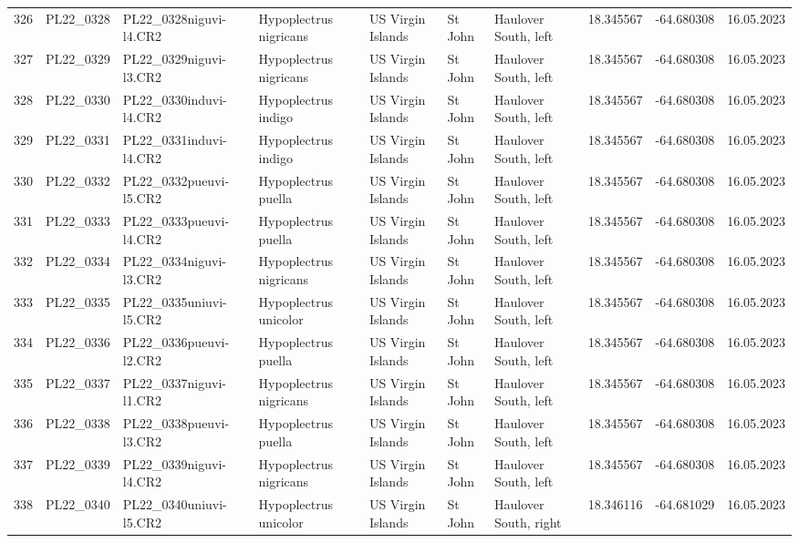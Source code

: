 \begin{table}[ht]
\begin{tabular}{rlllllllll}
  326 & PL22\_0328 & PL22\_0328niguvi-l4.CR2 & Hypoplectrus nigricans & US Virgin Islands & St John & Haulover South, left & 18.345567 & -64.680308 & 16.05.2023 \\ 
  327 & PL22\_0329 & PL22\_0329niguvi-l3.CR2 & Hypoplectrus nigricans & US Virgin Islands & St John & Haulover South, left & 18.345567 & -64.680308 & 16.05.2023 \\ 
  328 & PL22\_0330 & PL22\_0330induvi-l4.CR2 & Hypoplectrus indigo & US Virgin Islands & St John & Haulover South, left & 18.345567 & -64.680308 & 16.05.2023 \\ 
  329 & PL22\_0331 & PL22\_0331induvi-l4.CR2 & Hypoplectrus indigo & US Virgin Islands & St John & Haulover South, left & 18.345567 & -64.680308 & 16.05.2023 \\ 
  330 & PL22\_0332 & PL22\_0332pueuvi-l5.CR2 & Hypoplectrus puella & US Virgin Islands & St John & Haulover South, left & 18.345567 & -64.680308 & 16.05.2023 \\ 
  331 & PL22\_0333 & PL22\_0333pueuvi-l4.CR2 & Hypoplectrus puella & US Virgin Islands & St John & Haulover South, left & 18.345567 & -64.680308 & 16.05.2023 \\ 
  332 & PL22\_0334 & PL22\_0334niguvi-l3.CR2 & Hypoplectrus nigricans & US Virgin Islands & St John & Haulover South, left & 18.345567 & -64.680308 & 16.05.2023 \\ 
  333 & PL22\_0335 & PL22\_0335uniuvi-l5.CR2 & Hypoplectrus unicolor & US Virgin Islands & St John & Haulover South, left & 18.345567 & -64.680308 & 16.05.2023 \\ 
  334 & PL22\_0336 & PL22\_0336pueuvi-l2.CR2 & Hypoplectrus puella & US Virgin Islands & St John & Haulover South, left & 18.345567 & -64.680308 & 16.05.2023 \\ 
  335 & PL22\_0337 & PL22\_0337niguvi-l1.CR2 & Hypoplectrus nigricans & US Virgin Islands & St John & Haulover South, left & 18.345567 & -64.680308 & 16.05.2023 \\ 
  336 & PL22\_0338 & PL22\_0338pueuvi-l3.CR2 & Hypoplectrus puella & US Virgin Islands & St John & Haulover South, left & 18.345567 & -64.680308 & 16.05.2023 \\ 
  337 & PL22\_0339 & PL22\_0339niguvi-l4.CR2 & Hypoplectrus nigricans & US Virgin Islands & St John & Haulover South, left & 18.345567 & -64.680308 & 16.05.2023 \\ 
  338 & PL22\_0340 & PL22\_0340uniuvi-l5.CR2 & Hypoplectrus unicolor & US Virgin Islands & St John & Haulover South, right & 18.346116 & -64.681029 & 16.05.2023 \\ 

\end{tabular}
\end{table}
